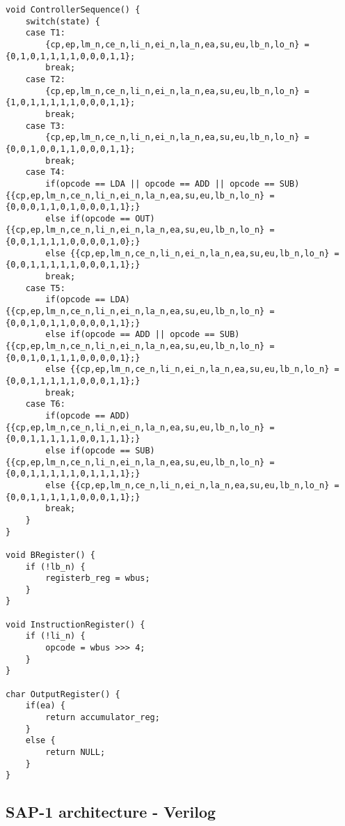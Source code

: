 \begin{lstlisting}[caption=SAP-1 architecture implemented in C]
void ControllerSequence() {
	switch(state) {
	case T1:
		{cp,ep,lm_n,ce_n,li_n,ei_n,la_n,ea,su,eu,lb_n,lo_n} = {0,1,0,1,1,1,1,0,0,0,1,1};
		break;
	case T2:
		{cp,ep,lm_n,ce_n,li_n,ei_n,la_n,ea,su,eu,lb_n,lo_n} = {1,0,1,1,1,1,1,0,0,0,1,1};
		break;
	case T3:
		{cp,ep,lm_n,ce_n,li_n,ei_n,la_n,ea,su,eu,lb_n,lo_n} = {0,0,1,0,0,1,1,0,0,0,1,1};
		break;
	case T4:
		if(opcode == LDA || opcode == ADD || opcode == SUB) {{cp,ep,lm_n,ce_n,li_n,ei_n,la_n,ea,su,eu,lb_n,lo_n} = {0,0,0,1,1,0,1,0,0,0,1,1};}
		else if(opcode == OUT) {{cp,ep,lm_n,ce_n,li_n,ei_n,la_n,ea,su,eu,lb_n,lo_n} = {0,0,1,1,1,1,0,0,0,0,1,0};}
		else {{cp,ep,lm_n,ce_n,li_n,ei_n,la_n,ea,su,eu,lb_n,lo_n} = {0,0,1,1,1,1,1,0,0,0,1,1};}
		break;
	case T5:
		if(opcode == LDA) {{cp,ep,lm_n,ce_n,li_n,ei_n,la_n,ea,su,eu,lb_n,lo_n} = {0,0,1,0,1,1,0,0,0,0,1,1};}
		else if(opcode == ADD || opcode == SUB) {{cp,ep,lm_n,ce_n,li_n,ei_n,la_n,ea,su,eu,lb_n,lo_n} = {0,0,1,0,1,1,1,0,0,0,0,1};}
		else {{cp,ep,lm_n,ce_n,li_n,ei_n,la_n,ea,su,eu,lb_n,lo_n} = {0,0,1,1,1,1,1,0,0,0,1,1};}
		break;
	case T6:
		if(opcode == ADD) {{cp,ep,lm_n,ce_n,li_n,ei_n,la_n,ea,su,eu,lb_n,lo_n} = {0,0,1,1,1,1,1,0,0,1,1,1};}
		else if(opcode == SUB) {{cp,ep,lm_n,ce_n,li_n,ei_n,la_n,ea,su,eu,lb_n,lo_n} = {0,0,1,1,1,1,1,0,1,1,1,1};}
		else {{cp,ep,lm_n,ce_n,li_n,ei_n,la_n,ea,su,eu,lb_n,lo_n} = {0,0,1,1,1,1,1,0,0,0,1,1};}
		break;
	}
}

void BRegister() {
	if (!lb_n) {
		registerb_reg = wbus;
	}
}

void InstructionRegister() {
	if (!li_n) {
		opcode = wbus >>> 4;
	}
}

char OutputRegister() {
	if(ea) {
		return accumulator_reg;
	}
	else {
		return NULL;
	}
}
\end{lstlisting}
\subsection{SAP-1 architecture - Verilog}
